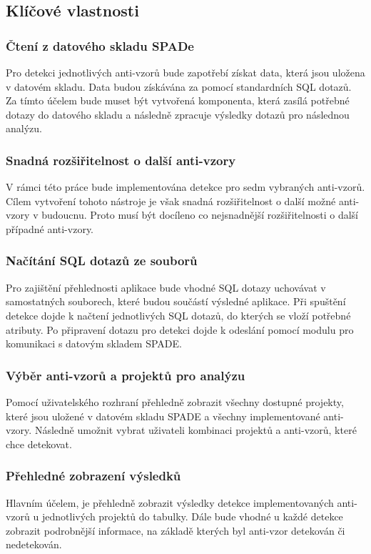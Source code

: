 \documentclass[czech,DP]{thesiskiv}
\begin{document}
\subsection{Klíčové vlastnosti}\label{sec:key_properties}
\subsubsection{Čtení z datového skladu SPADe}
Pro detekci jednotlivých anti-vzorů bude zapotřebí získat data, která jsou uložena v datovém skladu. Data budou získávána za pomocí standardních SQL dotazů. Za tímto účelem bude muset být vytvořená komponenta, která zasílá potřebné dotazy do datového skladu a následně zpracuje výsledky dotazů pro následnou analýzu.
\subsubsection{Snadná rozšiřitelnost o další anti-vzory}
V rámci této práce bude implementována detekce pro sedm vybraných anti-vzorů. Cílem vytvoření tohoto nástroje je však snadná rozšiřitelnost o další možné anti-vzory v budoucnu. Proto musí být docíleno co nejsnadnější rozšiřitelnosti o další případné anti-vzory.
\subsubsection{Načítání SQL dotazů ze souborů}
Pro zajištění přehlednosti aplikace bude vhodné SQL dotazy uchovávat v samostatných souborech, které budou součástí výsledné aplikace. Při spuštění detekce dojde k načtení jednotlivých SQL dotazů, do kterých se vloží potřebné atributy. Po připravení dotazu pro detekci dojde k odeslání pomocí modulu pro komunikaci s datovým skladem SPADE.  
\subsubsection{Výběr anti-vzorů a projektů pro analýzu}
Pomocí uživatelského rozhraní přehledně zobrazit všechny dostupné projekty, které jsou uložené v datovém skladu SPADE a všechny implementované anti-vzory. Následně umožnit vybrat uživateli kombinaci projektů a anti-vzorů, které chce detekovat.
\subsubsection{Přehledné zobrazení výsledků}
Hlavním účelem, je přehledně zobrazit výsledky detekce implementovaných anti-vzorů u jednotlivých projektů do tabulky. Dále bude vhodné u každé detekce zobrazit podrobnější informace, na základě kterých byl anti-vzor detekován či nedetekován.
\end{document}
